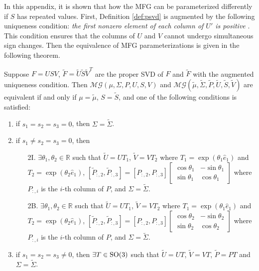 In this appendix, it is shown that how the MFG can be parameterized differently if $S$ has repeated values.
First, Definition \ref{def:psvd} is augmented by the following uniqueness condition:
\textit{the first nonzero element of each column of $U'$ is positive} \cite{khatri1977mises}.
This condition ensures that the columns of $U$ and $V$ cannot undergo simultaneous sign changes.
Then the equivalence of MFG parameterizations is given in the following theorem.
\begin{theorem} \label{thm:MFG-equivalent}
	Suppose $F=USV$, $\tilde{F}=\tilde{U}\tilde{S}\tilde{V}^T$ are the proper SVD of $F$ and $\tilde{F}$ with the augmented uniqueness condition.
	Then  $\mathcal{MG}(\mu,\allowbreak \Sigma,\allowbreak P,\allowbreak U,\allowbreak S,\allowbreak V)$ and $\mathcal{MG}(\tilde{\mu},\allowbreak \tilde{\Sigma},\allowbreak \tilde{P},\allowbreak \tilde{U},\allowbreak \tilde{S},\allowbreak \tilde{V})$ are equivalent if and only if $\mu=\tilde{\mu}$, $S=\tilde{S}$, and one of the following conditions is satisfied:
	\begin{enumerate}
		\item if $s_1=s_2=s_3=0$, then $\Sigma = \tilde{\Sigma}$. \label{case:s1=s2=s3=0}
		\item if $s_1 \neq s_2=s_3=0$, then \label{case:s1 neq s2=s3=0}
		\begin{enumerate}
			\item [2I.] $\exists \theta_1, \theta_2 \in \mathbb{R}$ such that $\tilde{U}=UT_1$, $\tilde{V}=VT_2$ where $T_1 = \exp(\theta_1\hat{e}_1)$ and $T_2 = \exp(\theta_2\hat{e}_1)$, $[\tilde{P}_{:,2},\tilde{P}_{:,3}] = [P_{:,2},P_{:,3}]\begin{bmatrix} \cos\theta_1 & -\sin\theta_1 \\ \sin\theta_1 & \cos\theta_1\end{bmatrix}$ where $P_{:,i}$ is the $i$-th column of $P$, and $\Sigma = \tilde{\Sigma}$.
			\item [2B.] $\exists \theta_1, \theta_2 \in \mathbb{R}$ such that $\tilde{U}=UT_1$, $\tilde{V}=VT_2$ where $T_1 = \exp(\theta_1\hat{e}_1)$ and $T_2 = \exp(\theta_2\hat{e}_1)$, $[\tilde{P}_{:,2},\tilde{P}_{:,3}] = [P_{:,2},P_{:,3}]\begin{bmatrix} \cos\theta_2 & -\sin\theta_2 \\ \sin\theta_2 & \cos\theta_2\end{bmatrix}$ where $P_{:,i}$ is the $i$-th column of $P$, and $\Sigma = \tilde{\Sigma}$.
		\end{enumerate} 
		\item if $s_1=s_2=s_3 \neq 0$, then $\exists T\in\mathrm{SO}(3)$ such that $\tilde{U}=UT$, $\tilde{V}=VT$, $\tilde{P}=PT$ and $\Sigma=\tilde{\Sigma}$.\label{case:s1=s2=s3 neq 0}

\end{enumerate}
\end{theorem}
